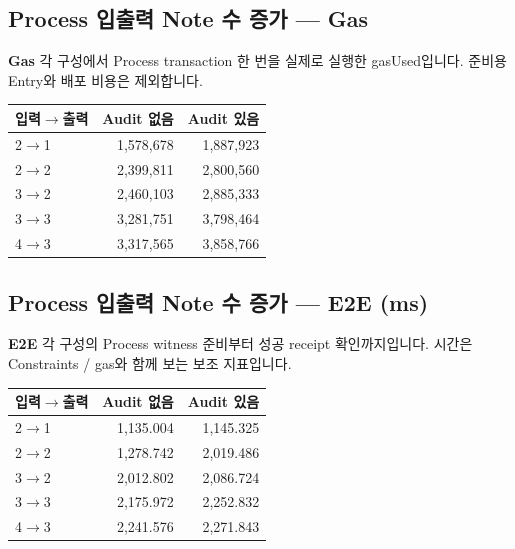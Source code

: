 \documentclass[11pt,a4paper]{article}
\begin{document}
\par\noindent\begin{minipage}{\linewidth}
\subsection*{Process 입출력 Note 수 증가 — Gas}
\textbf{Gas}\newline
각 구성에서 Process transaction 한 번을 실제로 실행한 gasUsed입니다.\newline
준비용 Entry와 배포 비용은 제외합니다.\par\smallskip
\begin{center}\small\begin{tabular}{@{}lrr@{}}\toprule
\textbf{입력$\rightarrow$출력} & \textbf{Audit 없음} & \textbf{Audit 있음} \\
\midrule
2$\rightarrow$1 & 1,578,678 & 1,887,923 \\
2$\rightarrow$2 & 2,399,811 & 2,800,560 \\
3$\rightarrow$2 & 2,460,103 & 2,885,333 \\
3$\rightarrow$3 & 3,281,751 & 3,798,464 \\
4$\rightarrow$3 & 3,317,565 & 3,858,766 \\
\bottomrule\end{tabular}\end{center}
\end{minipage}\par\medskip
\par\noindent\begin{minipage}{\linewidth}
\subsection*{Process 입출력 Note 수 증가 — E2E (ms)}
\textbf{E2E}\newline
각 구성의 Process witness 준비부터 성공 receipt 확인까지입니다.\newline
시간은 Constraints / gas와 함께 보는 보조 지표입니다.\par\smallskip
\begin{center}\small\begin{tabular}{@{}lrr@{}}\toprule
\textbf{입력$\rightarrow$출력} & \textbf{Audit 없음} & \textbf{Audit 있음} \\
\midrule
2$\rightarrow$1 & 1,135.004 & 1,145.325 \\
2$\rightarrow$2 & 1,278.742 & 2,019.486 \\
3$\rightarrow$2 & 2,012.802 & 2,086.724 \\
3$\rightarrow$3 & 2,175.972 & 2,252.832 \\
4$\rightarrow$3 & 2,241.576 & 2,271.843 \\
\bottomrule\end{tabular}\end{center}
\end{minipage}\par\medskip
\end{document}
